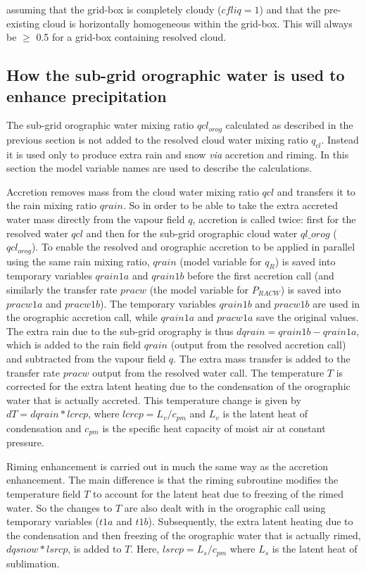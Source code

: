 \documentclass{UMDP_article}
\begin{document}
assuming that the grid-box is completely cloudy ($cfliq=1$) and that the pre-existing cloud is horizontally homogeneous within the grid-box.  This will always be $\ge$ 0.5 for a grid-box containing resolved cloud.


\subsection{How the sub-grid orographic water is used to enhance precipitation}

The sub-grid orographic water mixing ratio $qcl_{orog}$ calculated as described in the previous section is not added to the resolved cloud water mixing ratio $q_{cl}$.  Instead it is used only to produce extra rain and snow {\it via} accretion and riming.  In this section the model variable names are used to describe the calculations.  

Accretion removes mass from the cloud water mixing ratio $qcl$ and transfers it to the rain mixing ratio $qrain$.  
So in order to be able to take the extra accreted water mass directly from the vapour field $q$, accretion is called twice: first for the resolved water $qcl$ and then for the sub-grid orographic cloud water $ql\_orog$ ($qcl_{orog}$).  
To enable the resolved and orographic accretion to be applied in parallel using the same rain mixing ratio, $qrain$ (model variable for $q_R$) is saved into temporary variables $qrain1a$ and $qrain1b$ before the first accretion call (and similarly the transfer rate $pracw$ (the model variable for $P_{RACW}$) is saved into $pracw1a$ and $pracw1b$).  The temporary variables $qrain1b$ and $pracw1b$ are used in the orographic accretion call, while $qrain1a$ and $pracw1a$ save the original values.  The extra rain due to the sub-grid orography is thus $dqrain = qrain1b - qrain1a$, which is added to the rain field $qrain$ (output from the resolved accretion call) and subtracted from the vapour field $q$.  The extra mass transfer is added to the transfer rate $pracw$ output from the resolved water call.  
The temperature $T$ is corrected for the extra latent heating due to the condensation of the orographic water that is actually accreted.  This temperature change is given by 
$dT = dqrain * lcrcp$, where $lcrcp = L_v/c_{pm}$ and $L_v$ is the latent heat of condensation and $c_{pm}$ is the specific heat capacity of moist air at constant pressure.  

Riming enhancement is carried out in much the same way as the accretion enhancement.  
The main difference is that the riming subroutine modifies the temperature field $T$ to account for the latent heat due to freezing of the rimed water.  So the changes to $T$ are also dealt with in the orographic call using temporary variables ($t1a$ and $t1b$).  
Subsequently, the extra latent heating due to the condensation and then freezing of the orographic water that is actually rimed, $dqsnow * lsrcp$,  is added to $T$.  Here, 
$lsrcp = L_s/c_{pm}$ where $L_s$ is the latent heat of sublimation.  
\end{document}
